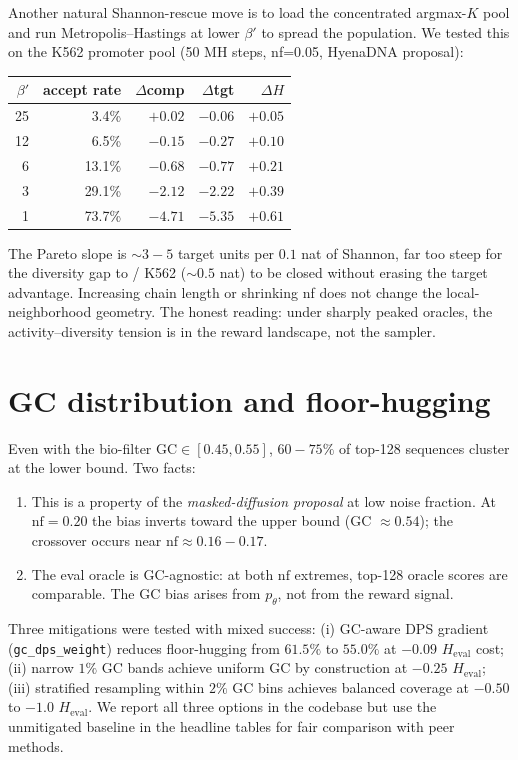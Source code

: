 Another natural Shannon-rescue move is to load the concentrated argmax-$K$ pool and run Metropolis–Hastings at lower $\beta'$ to spread the population. We tested this on the K562 promoter pool (50 MH steps, nf=0.05, HyenaDNA proposal):

\begin{center}
\small
\begin{tabular}{rrrrr}
\toprule
$\beta'$ & accept rate & $\Delta$comp & $\Delta$tgt & $\Delta H$ \\
\midrule
25 &  3.4\% & $+0.02$ & $-0.06$ & $+0.05$ \\
12 &  6.5\% & $-0.15$ & $-0.27$ & $+0.10$ \\
 6 & 13.1\% & $-0.68$ & $-0.77$ & $+0.21$ \\
 3 & 29.1\% & $-2.12$ & $-2.22$ & $+0.39$ \\
 1 & 73.7\% & $-4.71$ & $-5.35$ & $+0.61$ \\
\bottomrule
\end{tabular}
\end{center}
The Pareto slope is $\sim\!3\!-\!5$ target units per $0.1$ nat of Shannon, far too steep for the diversity gap to \dnacraft{}/\ctrldna{} K562 ($\sim\!0.5$ nat) to be closed without erasing the target advantage. Increasing chain length or shrinking nf does not change the local-neighborhood geometry. The honest reading: under sharply peaked oracles, the activity–diversity tension is in the reward landscape, not the sampler.

\section{GC distribution and floor-hugging}\label{app:gc}

Even with the bio-filter $\mathrm{GC}\!\in\![0.45,0.55]$, $60\!-\!75\%$ of \gpa{} top-128 sequences cluster at the lower bound. Two facts:
\begin{enumerate}
\item This is a property of the \emph{masked-diffusion proposal} at low noise fraction. At $\mathrm{nf}\!=\!0.20$ the bias inverts toward the upper bound (GC $\approx\!0.54$); the crossover occurs near $\mathrm{nf}\!\approx\!0.16\!-\!0.17$.
\item The eval oracle is GC-agnostic: at both $\mathrm{nf}$ extremes, top-128 oracle scores are comparable. The GC bias arises from $p_\theta$, not from the reward signal.
\end{enumerate}
Three mitigations were tested with mixed success: (i) GC-aware DPS gradient (\verb|gc_dps_weight|) reduces floor-hugging from $61.5\%$ to $55.0\%$ at $-0.09$ $H_{\mathrm{eval}}$ cost; (ii) narrow $1\%$ GC bands achieve uniform GC by construction at $-0.25$ $H_{\mathrm{eval}}$; (iii) stratified resampling within $2\%$ GC bins \citep{verge2015island} achieves balanced coverage at $-0.50$ to $-1.0$ $H_{\mathrm{eval}}$. We report all three options in the codebase but use the unmitigated baseline in the headline tables for fair comparison with peer methods.

